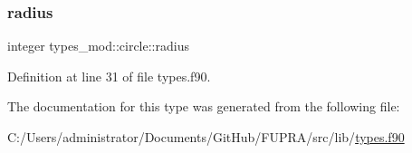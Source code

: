 \subsubsection{\texorpdfstring{radius}{radius}}
{\footnotesize\ttfamily integer types\+\_\+mod\+::circle\+::radius\hspace{0.3cm}{\ttfamily [private]}}



Definition at line 31 of file types.\+f90.



The documentation for this type was generated from the following file\+:\begin{DoxyCompactItemize}
\item 
C\+:/\+Users/administrator/\+Documents/\+Git\+Hub/\+F\+U\+P\+R\+A/src/lib/\mbox{\hyperlink{types_8f90}{types.\+f90}}\end{DoxyCompactItemize}
